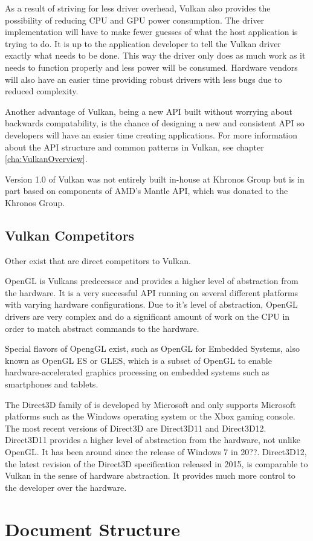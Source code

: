     As a result of striving for less driver overhead, Vulkan also provides the possibility of reducing CPU and GPU power consumption. The driver implementation will have to make fewer guesses of what the host application is trying to do. It is up to the application developer to tell the Vulkan driver exactly what needs to be done. This way the driver only does as much work as it needs to function properly and less power will be consumed. Hardware vendors will also have an easier time providing robust drivers with less bugs due to reduced complexity.

    Another advantage of Vulkan, being a new API built without worrying about backwards compatability, is the chance of designing a new and consistent API so developers will have an easier time creating applications. For more information about the API structure and common patterns in Vulkan, see chapter \ref{cha:VulkanOverview}.

    Version 1.0 of Vulkan was not entirely built in-house at Khronos Group but is in part based on components of AMD's Mantle API, which was donated to the Khronos Group.


    \subsection{Vulkan Competitors}

      Other  exist that are direct competitors to Vulkan.

      OpenGL is Vulkans predecessor and provides a higher level of abstraction from the hardware. It is a very successful API running on several different platforms with varying hardware configurations. Due to it's level of abstraction, OpenGL drivers are very complex and do a significant amount of work on the CPU in order to match abstract commands to the hardware.

      Special flavors of OpengGL exist, such as OpenGL for Embedded Systems, also known as OpenGL ES or GLES, which is a subset of OpenGL to enable hardware-accelerated graphics processing on embedded systems such as smartphones and tablets.

      The Direct3D family of  is developed by Microsoft and only supports Microsoft platforms such as the Windows operating system or the Xbox gaming console. The most recent versions of Direct3D are Direct3D11 and Direct3D12. Direct3D11 provides a higher level of abstraction from the hardware, not unlike OpenGL. It has been around since the release of Windows 7 in 20??. Direct3D12, the latest revision of the Direct3D specification released in 2015, is comparable to Vulkan in the sense of hardware abstraction. It provides much more control to the developer over the hardware.





  \section{Document Structure}

    \tbd
